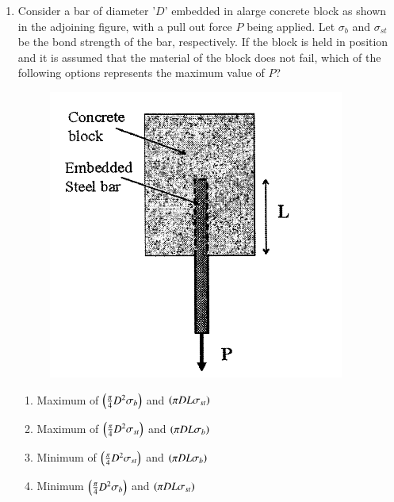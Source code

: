 \documentclass[journal,12pt,onecolumn]{IEEEtran}
\theoremstyle{remark}
\begin{document}
\begin{enumerate}
\item Consider a bar of diameter '$D$' embedded in alarge concrete block as shown in the adjoining figure, with a pull out force $P$ being applied. Let $\sigma_b$ and $\sigma_{st}$ be the bond strength of the bar, respectively. If the block is held in position and it is assumed that the material of the block does not fail, which of the following options represents the maximum value of $P$?
\begin{figure}[ht]
\centering
\includegraphics[scale=0.4]{figs/fig3.png}
\end{figure}
	\begin{multicols}{2}
	\begin{enumerate}
		\item Maximum of $\left(\frac{\pi}{4}D^{2}\sigma_{b}\right)$ and $\left(\pi DL\sigma_{st}\right)$
		\item Maximum of $\left(\frac{\pi}{4}D^{2}\sigma_{st}\right)$ and $\left(\pi DL\sigma_{b}\right)$
		\item Minimum of $\left(\frac{\pi}{4}D^{2}\sigma_{st}\right)$ and $\left(\pi DL\sigma_{b}\right)$
		\item Minimum $\left(\frac{\pi}{4}D^{2}\sigma_{b}\right)$ and $\left(\pi DL\sigma_{st}\right)$
	\end{enumerate}
	\end{multicols}


\end{enumerate}
\end{document}
